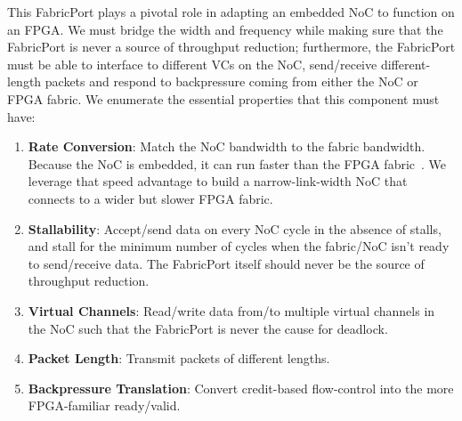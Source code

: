 This FabricPort plays a pivotal role in adapting an embedded NoC to function on an FPGA.
We must bridge the width and frequency while making sure that the FabricPort is never a source of throughput reduction; furthermore, the FabricPort must be able to interface to different VCs on the NoC, send/receive different-length packets and respond to backpressure coming from either the NoC or FPGA fabric.
We enumerate the essential properties that this component must have:

\begin{enumerate}
\item \textbf{Rate Conversion}: Match the NoC bandwidth to the fabric bandwidth. Because the NoC is embedded, it can run \xx faster than the FPGA fabric~\cite{trets}. We leverage that speed advantage to build a narrow-link-width NoC that connects to a wider but slower FPGA fabric.
\item \textbf{Stallability}: Accept/send data on every NoC cycle in the absence of stalls, and stall for the minimum number of cycles when the fabric/NoC isn't ready to send/receive data. The FabricPort itself should never be the source of throughput reduction.
\item \textbf{Virtual Channels}: Read/write data from/to multiple virtual channels in the NoC such that the FabricPort is never the cause for deadlock.
\item \textbf{Packet Length}: Transmit packets of different lengths.
\item \textbf{Backpressure Translation}: Convert credit-based flow-control into the more FPGA-familiar ready/valid.
\end{enumerate}


%
%


